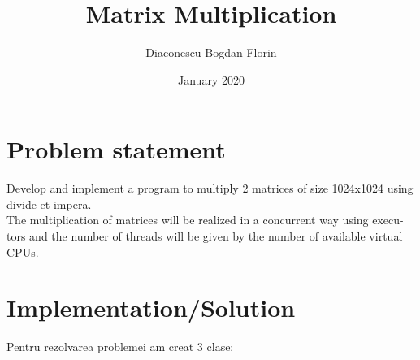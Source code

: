 \documentclass{article}
\title{Matrix Multiplication}
\author{Diaconescu Bogdan Florin}
\date{January 2020}
\begin{document}
\maketitle

\section{Problem statement}
Develop and implement a program to multiply 2 matrices
of size 1024x1024 using divide-et-impera.\\
The multiplication of matrices will be realized in a concurrent way using execu-
tors and the number of threads will be given by the number of available virtual
CPUs.

\section{Implementation/Solution}
Pentru rezolvarea problemei am creat 3 clase:
\end{document}
